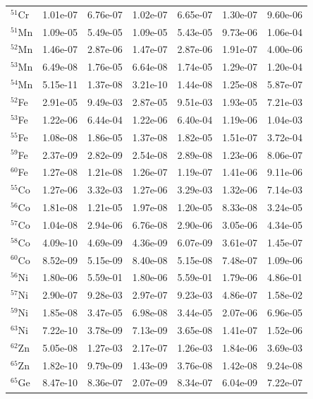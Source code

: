\begin{table}
\begin{tabular}{l|cc|cc|cc}
$^{51}$Cr & 1.01e-07 & 6.76e-07 & 1.02e-07 & 6.65e-07 & 1.30e-07 & 9.60e-06\\
$^{51}$Mn & 1.09e-05 & 5.49e-05 & 1.09e-05 & 5.43e-05 & 9.73e-06 & 1.06e-04\\
$^{52}$Mn & 1.46e-07 & 2.87e-06 & 1.47e-07 & 2.87e-06 & 1.91e-07 & 4.00e-06\\
$^{53}$Mn & 6.49e-08 & 1.76e-05 & 6.64e-08 & 1.74e-05 & 1.29e-07 & 1.20e-04\\
$^{54}$Mn & 5.15e-11 & 1.37e-08 & 3.21e-10 & 1.44e-08 & 1.25e-08 & 5.87e-07\\
$^{52}$Fe & 2.91e-05 & 9.49e-03 & 2.87e-05 & 9.51e-03 & 1.93e-05 & 7.21e-03\\
$^{53}$Fe & 1.22e-06 & 6.44e-04 & 1.22e-06 & 6.40e-04 & 1.19e-06 & 1.04e-03\\
$^{55}$Fe & 1.08e-08 & 1.86e-05 & 1.37e-08 & 1.82e-05 & 1.51e-07 & 3.72e-04\\
$^{59}$Fe & 2.37e-09 & 2.82e-09 & 2.54e-08 & 2.89e-08 & 1.23e-06 & 8.06e-07\\
$^{60}$Fe & 1.27e-08 & 1.21e-08 & 1.26e-07 & 1.19e-07 & 1.41e-06 & 9.11e-06\\
$^{55}$Co & 1.27e-06 & 3.32e-03 & 1.27e-06 & 3.29e-03 & 1.32e-06 & 7.14e-03\\
$^{56}$Co & 1.81e-08 & 1.21e-05 & 1.97e-08 & 1.20e-05 & 8.33e-08 & 3.24e-05\\
$^{57}$Co & 1.04e-08 & 2.94e-06 & 6.76e-08 & 2.90e-06 & 3.05e-06 & 4.34e-05\\
$^{58}$Co & 4.09e-10 & 4.69e-09 & 4.36e-09 & 6.07e-09 & 3.61e-07 & 1.45e-07\\
$^{60}$Co & 8.52e-09 & 5.15e-09 & 8.40e-08 & 5.15e-08 & 7.48e-07 & 1.09e-06\\
$^{56}$Ni & 1.80e-06 & 5.59e-01 & 1.80e-06 & 5.59e-01 & 1.79e-06 & 4.86e-01\\
$^{57}$Ni & 2.90e-07 & 9.28e-03 & 2.97e-07 & 9.23e-03 & 4.86e-07 & 1.58e-02\\
$^{59}$Ni & 1.85e-08 & 3.47e-05 & 6.98e-08 & 3.44e-05 & 2.07e-06 & 6.96e-05\\
$^{63}$Ni & 7.22e-10 & 3.78e-09 & 7.13e-09 & 3.65e-08 & 1.41e-07 & 1.52e-06\\
$^{62}$Zn & 5.05e-08 & 1.27e-03 & 2.17e-07 & 1.26e-03 & 1.84e-06 & 3.69e-03\\
$^{65}$Zn & 1.82e-10 & 9.79e-09 & 1.43e-09 & 3.76e-08 & 1.42e-08 & 9.24e-08\\
$^{65}$Ge & 8.47e-10 & 8.36e-07 & 2.07e-09 & 8.34e-07 & 6.04e-09 & 7.22e-07\\
\hline
\end{tabular}
\end{table}

